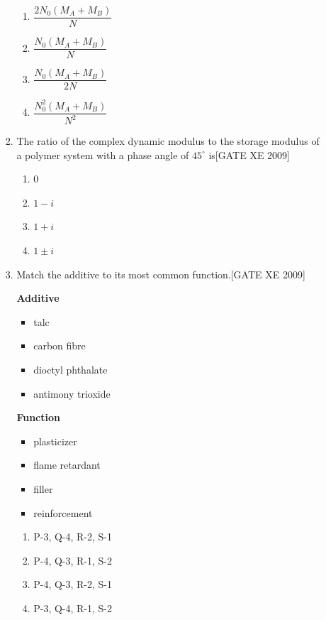 \documentclass[journal,12pt,onecolumn]{IEEEtran}
\theoremstyle{remark}
\begin{document}
\begin{enumerate}
\begin{enumerate}
\begin{enumerate}[label=\textbf{Q.\arabic*.},  wide=0pt, leftmargin=*]
\begin{multicols}{2}
\begin{enumerate}
\item $\dfrac{2N_0(M_A + M_B)}{N}$
\item $\dfrac{N_0(M_A + M_B)}{N}$
\item $\dfrac{N_0(M_A + M_B)}{2N}$
\item $\dfrac{N_0^2(M_A + M_B)}{N^2}$
\end{enumerate}
\end{multicols}

\item The ratio of the complex dynamic modulus to the storage modulus of a polymer system with a phase angle of $45^\circ$ is\hfill[GATE XE 2009]

\begin{multicols}{2}
\begin{enumerate}
\item 0
\item $1 - i$
\item $1 + i$
\item $1 \pm i$
\end{enumerate}
\end{multicols}

\item Match the additive to its most common function.\hfill[GATE XE 2009]\\[0.5em]
\begin{minipage}{0.45\textwidth}
\textbf{Additive}
\begin{itemize}
  \item[P.] talc
  \item[Q.] carbon fibre
  \item[R.] dioctyl phthalate
  \item[S.] antimony trioxide
\end{itemize}
\end{minipage}
\hfill
\begin{minipage}{0.45\textwidth}
\textbf{Function}
\begin{itemize}
  \item[1.] plasticizer
  \item[2.] flame retardant
  \item[3.] filler
  \item[4.] reinforcement
\end{itemize}
\end{minipage}

\vspace{0.5em}
\begin{multicols}{2}
\begin{enumerate}
\item P-3, Q-4, R-2, S-1
\item P-4, Q-3, R-1, S-2
\item P-4, Q-3, R-2, S-1
\item P-3, Q-4, R-1, S-2
\end{enumerate}
\end{multicols}


\end{enumerate}
\end{enumerate}
\end{enumerate}
\end{document}
